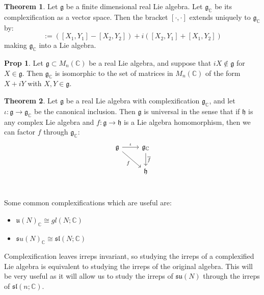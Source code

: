 \documentclass[11pt, oneside]{article}   	%
\theoremstyle{definition}
\newtheorem{theorem}{Theorem}[section]
\newtheorem{prop}{Prop}[section]
\begin{document}
\begin{theorem}
	Let $\mathfrak g$ be a finite dimensional real Lie algebra. Let $\mathfrak g_\mathbb{C}$ be its complexification as a vector 
	space. Then the bracket $[\cdot, \cdot]$ extends uniquely to $\mathfrak g_\mathbb{C}$ by:
	\begin{equation}
		[X_1 + iX_2, Y_1 + iY_2] := ([X_1, Y_1] - [X_2, Y_2]) + i([X_2, Y_1] + [X_1, Y_2])
	\end{equation}
	making $\mathfrak g_\mathbb{C}$ into a Lie algebra. 
\end{theorem}

\begin{prop}
	Let $\mathfrak g\subset M_n(\mathbb C)$ be a real Lie algebra, and suppose that $iX\not\in\mathfrak g$ for $X\in\mathfrak g$. 
	Then $\mathfrak g_\mathbb{C}$ is isomorphic to the set of matrices in $M_n(\mathbb C)$ of the form $X + iY$ with $X, Y\in
	\mathfrak g$. 
\end{prop}

\begin{theorem}
	Let $\mathfrak g$ be a real Lie algebra with complexification $\mathfrak g_\mathbb{C}$, and let $\iota : \mathfrak g\rightarrow
	\mathfrak g_\mathbb{C}$ be the canonical inclusion. Then $\mathfrak g$ is universal in the sense that if $\mathfrak h$ is any 
	complex Lie algebra and $f : \mathfrak g\rightarrow\mathfrak h$ is a Lie algebra homomorphism, then we can factor $f$ through 
	$\mathfrak g_\mathbb{C}$:
	\[\begin{tikzcd}
		\mathfrak g\arrow[r, "\iota"]\arrow[dr, swap, "f"] & \mathfrak g_\mathbb{C}\arrow[d, "\overline{f}"] \\
		& \mathfrak h \\
	\end{tikzcd}\]
\end{theorem}
Some common complexifications which are useful are:
\begin{itemize}
	\item $\mathfrak u(N)_\mathbb{C}\cong gl(N; \mathbb C)$
	\item $\mathfrak su(N)_\mathbb{C}\cong \mathfrak{sl}(N; \mathbb C)$
\end{itemize}

Complexification leaves irreps invariant, so studying the irreps of a complexified Lie algebra is equivalent to studying the irreps of the 
original algebra. This will be very useful as it will allow us to study the irreps of $\mathfrak{su}(N)$ through the irreps of $\mathfrak{sl}(n; 
\mathbb C)$. 
\end{document}
